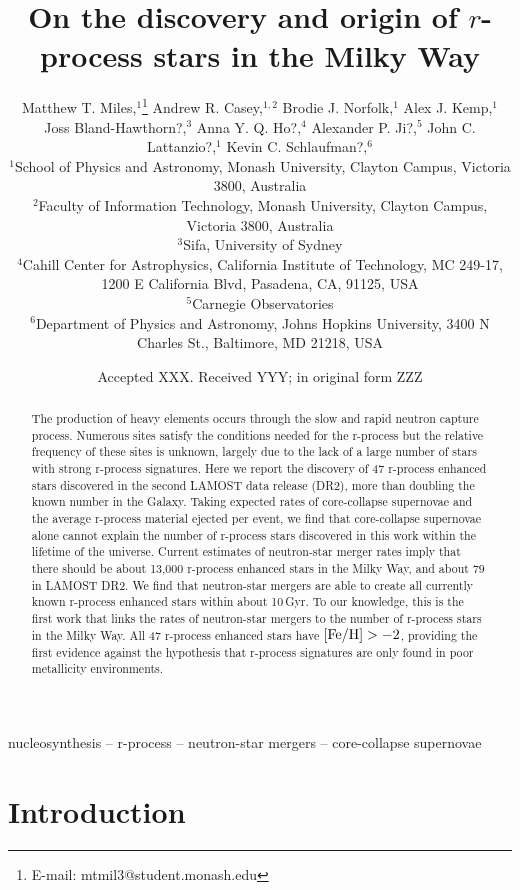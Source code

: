 \documentclass[a4paper,fleqn,usenatbib]{mnras}
\title[Discovery and origin of $r$-process stars]{On the discovery and origin of $r$-process stars in the Milky Way}
\author[Matthew T. Miles et al.]{Matthew T. Miles,$^{1}$\thanks{E-mail: mtmil3@student.monash.edu}
	Andrew R. Casey,$^{1,2}$
	Brodie J. Norfolk,$^{1}$
	Alex J. Kemp,$^{1}$\newauthor
    Joss Bland-Hawthorn?,$^3$
    Anna Y. Q. Ho?,$^4$
    Alexander P. Ji?,$^5$
	John C. Lattanzio?,$^{1}$
	Kevin C. Schlaufman?,$^{6}$
	\\
	$^{1}$School of Physics and Astronomy, Monash University, Clayton Campus, Victoria 3800, Australia\\
	$^{2}$Faculty of Information Technology, Monash University, Clayton Campus, Victoria 3800, Australia\\
    $^{3}$Sifa, University of Sydney\\
	$^{4}$Cahill Center for Astrophysics, California Institute of Technology, MC 249-17, 1200 E California Blvd, Pasadena, CA, 91125, USA\\
    $^{5}$Carnegie Observatories\\
    $^{6}$Department of Physics and Astronomy, Johns Hopkins University, 3400 N Charles St., Baltimore, MD 21218, USA
}
\date{Accepted XXX. Received YYY; in original form ZZZ}
\begin{document}
	\label{firstpage}
	\pagerange{\pageref{firstpage}--\pageref{lastpage}}
	\maketitle
	
	\begin{abstract}
		The production of heavy elements occurs through the slow and rapid neutron capture process. Numerous sites satisfy the conditions needed for the r-process but the relative frequency of these sites is unknown, largely due to the lack of a large number of stars with strong r-process signatures. Here we report the discovery of 47 r-process enhanced stars discovered in the second LAMOST data release (DR2), more than doubling the known number in the Galaxy. Taking expected rates of core-collapse supernovae and the average r-process material ejected per event, we find that core-collapse supernovae alone cannot explain the number of r-process stars discovered in this work within the lifetime of the universe. Current estimates of neutron-star merger rates imply that there should be about 13,000 r-process enhanced stars in the Milky Way, and about $79$ in LAMOST DR2. We find that neutron-star mergers are able to create all currently known r-process enhanced stars within about 10\,Gyr. To our knowledge, this is the first work that links the rates of neutron-star mergers to the number of r-process stars in the Milky Way. All 47 r-process enhanced stars have $[{\rm Fe/H}] > -2$, providing the first evidence against the hypothesis that r-process signatures are only found in poor metallicity environments.
	\end{abstract}
	
	\begin{keywords}
		nucleosynthesis -- r-process -- neutron-star mergers -- core-collapse supernovae
	\end{keywords}
	
	
	\section{Introduction}
	
\end{document}
